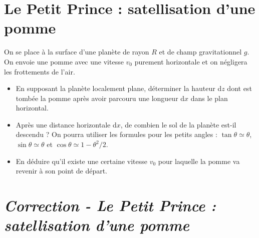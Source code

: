 \documentclass{report}
\begin{document}
\section*{Le Petit Prince : satellisation d'une pomme}

On se place à la surface d'une planète de rayon $R$ et de champ gravitationnel $g$. On envoie une pomme avec une vitesse $v_0$ purement horizontale et on négligera les frottements de l'air.

\begin{itemize}
\item En supposant la planète localement plane, déterminer la hauteur d$z$ dont est tombée la pomme après avoir parcouru une longueur d$x$ dans le plan horizontal. %
\item Après une distance horizontale d$x$, de combien le sol de la planète est-il descendu ? On pourra utiliser les formules pour les petits angles : $\tan\theta\simeq \theta$, $\sin\theta\simeq \theta$ et $\cos\theta\simeq 1-\theta^2/2$. %
\item En déduire qu'il existe une certaine vitesse $v_0$ pour laquelle la pomme va revenir à son point de départ. %
\end{itemize}

\newpage

\section*{\textit{Correction - Le Petit Prince : satellisation d'une pomme}}
\end{document}
